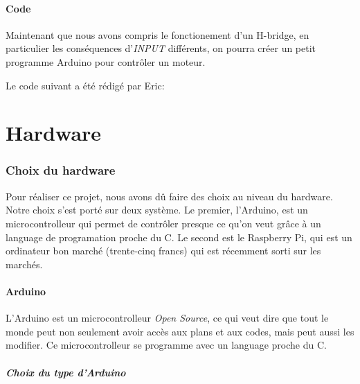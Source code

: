 \documentclass[a4paper,12pt]{article}
\begin{document}
{\subsection{Code}

Maintenant que nous avons compris le fonctionement d'un H-bridge, en
particulier les cons\'equences d'\emph{INPUT} diff\'erents, on pourra cr\'eer
un petit programme Arduino pour contr\^oler un moteur.

Le code suivant a \'et\'e r\'edig\'e par Eric:






\part{Hardware}

\section{Choix du hardware}
Pour réaliser ce projet, nous avons dû faire des choix au niveau du hardware. Notre choix s'est porté sur deux système. Le premier, l'Arduino, est un microcontrolleur qui permet de contrôler presque ce qu'on veut grâce à un language de programation proche du C. Le second est le Raspberry Pi, qui est un ordinateur bon marché (trente-cinq francs) qui est récemment sorti sur les marchés. 


\subsection{Arduino}
L'Arduino \cite{Arduino} est un microcontrolleur \textit{Open Source}, ce qui veut dire que tout le monde peut non seulement avoir accès aux plans et aux codes, mais peut aussi les modifier. Ce microcontrolleur se programme avec un language proche du C. 


\subsubsection{Choix du type d'Arduino}



}
\end{document}
